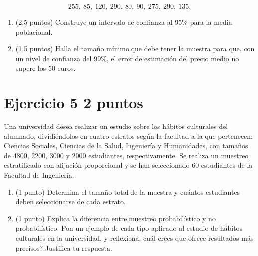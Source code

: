 \documentclass[11pt]{article}
\begin{document}
\[
255,\ 85,\ 120,\ 290,\ 80,\ 90,\ 275,\ 290,\ 135.
\]

\begin{enumerate}[label=(\alph*)]

 \item (2,5 puntos)  Construye un intervalo de confianza al 95\% para la media poblacional.



  \item (1,5 puntos)  Halla el tamaño mínimo que debe tener la muestra para que, con un nivel de confianza del 99\%, el error de estimación del precio medio no supere los 50 euros.

  

\end{enumerate}


\clearpage
\section*{Ejercicio 5 \hfill 2 puntos}
 Una universidad desea realizar un estudio sobre los hábitos culturales del alumnado, dividiéndolos en cuatro estratos según la facultad a la que pertenecen: Ciencias Sociales, Ciencias de la Salud, Ingeniería y Humanidades, con tamaños de 4800, 2200, 3000 y 2000 estudiantes, respectivamente. Se realiza un muestreo estratificado con afijación proporcional y se han seleccionado 60 estudiantes de la Facultad de Ingeniería.

\begin{enumerate}[label=(\alph*)]
  \item (1 punto)  Determina el tamaño total de la muestra y cuántos estudiantes deben seleccionarse de cada estrato.
  
  

  \item (1 punto)  Explica la diferencia entre muestreo probabilístico y no probabilístico. Pon un ejemplo de cada tipo aplicado al estudio de hábitos culturales en la universidad, y reflexiona: \textquestiondown{}cuál crees que ofrece resultados más precisos? Justifica tu respuesta.

  
\end{enumerate}
\end{document}
